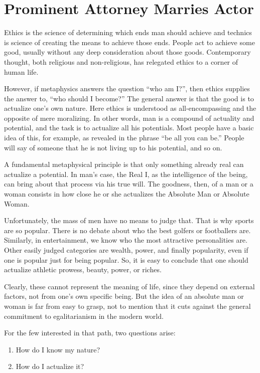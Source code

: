 \section{Prominent Attorney Marries Actor}

Ethics is the science of determining which ends man should achieve and technics is science of creating the means to achieve those ends. People act to achieve some good, usually without any deep consideration about those goods. Contemporary thought, both religious and non-religious, has relegated ethics to a corner of human life.

However, if metaphysics answers the question ``who am I?'', then ethics supplies the answer to, ``who should I become?'' The general answer is that the good is to actualize one's own nature. Here ethics is understood as all-encompassing and the opposite of mere moralizing. In other words, man is a compound of actuality and potential, and the task is to actualize all his potentials. Most people have a basic idea of this, for example, as revealed in the phrase ``be all you can be.'' People will say of someone that he is not living up to his potential, and so on.

A fundamental metaphysical principle is that only something already real can actualize a potential. In man's case, the Real I, as the intelligence of the being, can bring about that process via his true will. The goodness, then, of a man or a woman consists in how close he or she actualizes the Absolute Man or Absolute Woman.

Unfortunately, the mass of men have no means to judge that. That is why sports are so popular. There is no debate about who the best golfers or footballers are. Similarly, in entertainment, we know who the most attractive personalities are. Other easily judged categories are wealth, power, and finally popularity, even if one is popular just for being popular. So, it is easy to conclude that one should actualize athletic prowess, beauty, power, or riches.

Clearly, these cannot represent the meaning of life, since they depend on external factors, not from one's own specific being. But the idea of an absolute man or woman is far from easy to grasp, not to mention that it cuts against the general commitment to egalitarianism in the modern world.

For the few interested in that path, two questions arise:

\begin{enumerate}


\item How do I know my nature?

\item How do I actualize it?
\end{enumerate}


